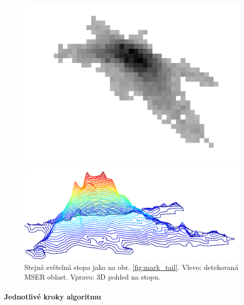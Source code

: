 	\begin{figure}[h!]
	\centering
	\begin{minipage}[c]{0.4\textwidth}
	\includegraphics[width=\textwidth]{figures/tailex01.pdf}
	\end{minipage}
	\begin{minipage}[c]{0.4\textwidth}
	\includegraphics[width=\textwidth]{figures/tailex02.pdf}
	\end{minipage}
	
	\caption[Detektor ocásků - detekce stopy.]{Stejná světelná stopa jako na obr. \ref{fig:mark_tail}. Vlevo: detekovaná MSER oblast. Vpravo: 3D pohled na stopu.}
	\label{fig:mark_tail2}
	\end{figure}


\paragraph{Jednotlivé kroky algoritmu}

